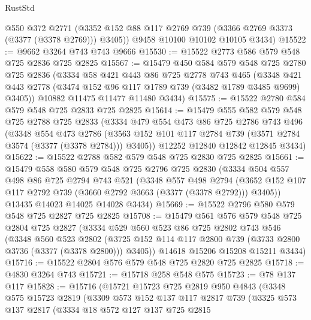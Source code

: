 \begin{lexlean}{RustStd}
\begin{coremodule}
        @550
        @372
        @2771
        (@3352 @152 @88 @117 @2769 @739 (@3366 @2769 @3373 (@3377 (@3378 @2769))) @3405))
      @9458
      @10100
      @10102
      @10105
      @3434)
@15522 := @9662 @3264 @743 @743 @9666
@15530 := @15522 @2773 @586 @579 @548 @725 @2836 @725 @2825
@15567 := @15479
    @450
    @584
    @579
    @548
    @725
    @2780
    @725
    @2836
    (@3334
      @58
      @421
      @443
      @86
      @725
      @2778
      @743
      @465
      (@3348 @421 @443 @2778 (@3474 @152 @96 @117 @1789 @739 (@3482 @1789 @3485 @9699) @3405))
      @10882
      @11475
      @11477
      @11480
      @3434)
@15575 := @15522 @2780 @584 @579 @548 @725 @2833 @725 @2825
@15614 := @15479
    @555
    @582
    @579
    @548
    @725
    @2788
    @725
    @2833
    (@3334
      @479
      @554
      @473
      @86
      @725
      @2786
      @743
      @496
      (@3348
        @554
        @473
        @2786
        (@3563 @152 @101 @117 @2784 @739 (@3571 @2784 @3574 (@3377 (@3378 @2784))) @3405))
      @12252
      @12840
      @12842
      @12845
      @3434)
@15622 := @15522 @2788 @582 @579 @548 @725 @2830 @725 @2825
@15661 := @15479
    @558
    @580
    @579
    @548
    @725
    @2796
    @725
    @2830
    (@3334
      @504
      @557
      @498
      @86
      @725
      @2794
      @743
      @521
      (@3348
        @557
        @498
        @2794
        (@3652 @152 @107 @117 @2792 @739 (@3660 @2792 @3663 (@3377 (@3378 @2792))) @3405))
      @13435
      @14023
      @14025
      @14028
      @3434)
@15669 := @15522 @2796 @580 @579 @548 @725 @2827 @725 @2825
@15708 := @15479
    @561
    @576
    @579
    @548
    @725
    @2804
    @725
    @2827
    (@3334
      @529
      @560
      @523
      @86
      @725
      @2802
      @743
      @546
      (@3348
        @560
        @523
        @2802
        (@3725 @152 @114 @117 @2800 @739 (@3733 @2800 @3736 (@3377 (@3378 @2800))) @3405))
      @14618
      @15206
      @15208
      @15211
      @3434)
@15716 := @15522 @2804 @576 @579 @548 @725 @2820 @725 @2825
@15718 := @4830 @3264 @743
@15721 := @15718 @258 @548 @575
@15723 := @78 @137 @117
@15828 := @15716
    (@15721
      @15723
      @725
      @2819
      @950
      @4843
      (@3348
        @575
        @15723
        @2819
        (@3309
          @573
          @152
          @137
          @117
          @2817
          @739
          (@3325
            @573
            @137
            @2817
            (@3334
              @18
              @572
              @127
              @137
              @725
              @2815

\end{coremodule}
\end{lexlean}
